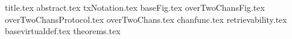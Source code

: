 \documentclass{llncs}
\begin{document}
\pagestyle{plain}
{title.tex}
{abstract.tex}
{txNotation.tex}
{baseFig.tex}
{overTwoChansFig.tex}
{overTwoChansProtocol.tex}
{overTwoChans.tex}
{chanfunc.tex}
{retrievability.tex}
{basevirtualdef.tex}
{theorems.tex}

\end{document}
